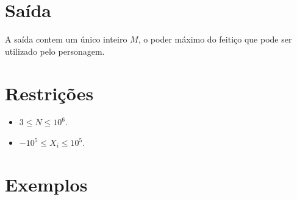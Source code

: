 \section*{Saída}

A saída contem um único inteiro $M$, o poder máximo do feitiço que pode ser utilizado pelo personagem.

\section*{Restrições}

\begin{itemize}
\item $3 \leq N \leq 10^6$.
\item $-10^5 \leq X_i \leq 10^5$.
\end{itemize}


\section*{Exemplos}

\exemplo
